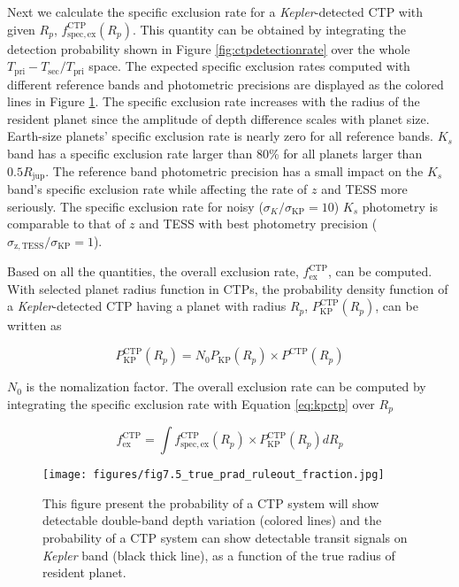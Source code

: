 \documentclass{aastex63}
\begin{document}
    Next we calculate the specific exclusion rate for a \emph{Kepler}-detected CTP with given $R_p$, $f^\mathrm{CTP}_\mathrm{spec,ex} (R_p)$. This quantity can be obtained by integrating the detection probability shown in Figure \ref{fig:ctpdetectionrate} over the whole $T_\mathrm{pri}-T_\mathrm{sec}/T_\mathrm{pri}$ space. The expected specific exclusion rates computed with different reference bands and photometric precisions are displayed as the colored lines in Figure \ref{fig:ctp_true_prad_ruleout}. The specific exclusion rate increases with the radius of the resident planet since the amplitude of depth difference scales with planet size. Earth-size planets' specific exclusion rate is nearly zero for all reference bands. $K_s$ band has a specific exclusion rate larger than 80\% for all planets larger than $0.5 R_\mathrm{jup}$. The reference band photometric precision has a small impact on the $K_s$ band's specific exclusion rate while affecting the rate of $z$ and TESS more seriously. The specific exclusion rate for noisy ($\sigma_K/\sigma_\mathrm{KP}=10$) $K_s$ photometry is comparable to that of $z$ and TESS with best photometry precision ($\sigma_\mathrm{z,TESS}/\sigma_\mathrm{KP}=1$).

    Based on all the quantities, the overall exclusion rate, $f^\mathrm{CTP}_\mathrm{ex}$, can be computed. With selected planet radius function in CTPs, the probability density function of a \emph{Kepler}-detected CTP having a planet with radius $R_p$, $P^\mathrm{CTP}_\mathrm{KP}(R_p)$, can be written as
    
    \begin{equation}
    \label{eq:kpctp}
        P^\mathrm{CTP}_\mathrm{KP}(R_p) = N_0 P_\mathrm{KP}(R_p)  \times P^\mathrm{CTP}(R_p)
    \end{equation}
    
    $N_0$ is the nomalization factor. The overall exclusion rate can be computed by integrating the specific exclusion rate with Equation \ref{eq:kpctp} over $R_p$

    \begin{equation}
    f^\mathrm{CTP}_\mathrm{ex} = \int f^\mathrm{CTP}_\mathrm{spec,ex}(R_p) \times P^\mathrm{CTP}_\mathrm{KP}(R_p) d R_p 
    \end{equation}

    \begin{figure}[ht]
        \centering
        \texttt{[image: figures/fig7.5\_true\_prad\_ruleout\_fraction.jpg]}
        \caption{This figure present the probability of a CTP system will show detectable double-band depth variation (colored lines) and the probability of a CTP system can show detectable transit signals on \emph{Kepler} band (black thick line), as a function of the true radius of resident planet.}
        \label{fig:ctp_true_prad_ruleout}
    \end{figure}
    
\end{document}
